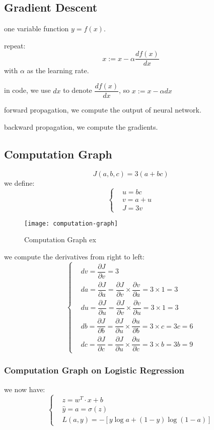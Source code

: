 \subsection{Gradient Descent}
one variable function $y = f(x)$.

repeat: $$x := x - \alpha \dfrac{df(x)}{dx}$$ with $\alpha$ as the learning rate.

in code, we use $dx$ to denote $\dfrac{df(x)}{dx}$, so $x := x - \alpha dx$

forward propagation, we compute the output of neural network.

backward propagation, we compute the gradients.

\subsection{Computation Graph}
$$J(a, b, c) = 3(a + bc)$$
we define:
$$
\left\{
\begin{aligned}
& u = bc \\
& v = a + u \\
& J = 3v
\end{aligned}
\right.
$$

\begin{figure}[htbp]
	\centering
	\texttt{[image: computation-graph]}\\
	\caption{Computation Graph ex}\label{fig.computation-graph}
\end{figure}

we compute the derivatives from right to left:
$$
\left\{
\begin{aligned}
& dv = \dfrac{\partial J}{\partial v} = 3 \\
& da = \dfrac{\partial J}{\partial a} = \dfrac{\partial J}{\partial v} \times \dfrac{\partial v}{\partial a} = 3 \times 1 = 3 \\
& du = \dfrac{\partial J}{\partial u} = \dfrac{\partial J}{\partial v} \times \dfrac{\partial v}{\partial u} = 3 \times 1 = 3 \\
& db = \dfrac{\partial J}{\partial b} = \dfrac{\partial J}{\partial u} \times \dfrac{\partial u}{\partial b}= 3 \times c = 3c = 6 \\
& dc = \dfrac{\partial J}{\partial c} = \dfrac{\partial J}{\partial u} \times \dfrac{\partial u}{\partial c}= 3 \times b = 3b = 9
\end{aligned}
\right.
$$

\subsubsection{Computation Graph on Logistic Regression}
we now have:
$$
\left\{
\begin{aligned}
& z = w^T \cdot x + b \\
& \hat{y} = a = \sigma(z) \\
& L(a, y) = - [y \log a + (1 - y) \log (1 - a)]
\end{aligned}
\right.
$$

